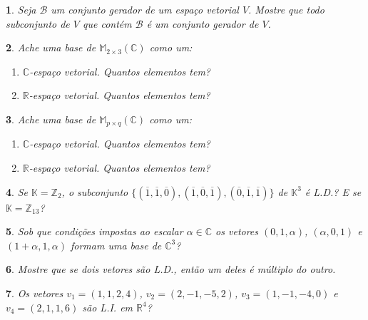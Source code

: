 \documentclass[12pt]{exam}
\newtheorem{exercicio}{}
\newcommand{\integer}{\mathbb{Z}}
\newcommand{\real}{\mathbb{R}}
\newcommand{\complex}{\mathbb{C}}
\newcommand{\cp}[1]{\mathbb{#1}}
\begin{document}
\begin{exercicio}
Seja $\mathcal{B}$ um conjunto gerador de um espa\c{c}o vetorial $V$. Mostre que todo subconjunto de $V$ que cont\'em $\mathcal{B}$ \'e um conjunto gerador de $V$.
\end{exercicio}

\begin{exercicio}
  Ache uma base de $\cp{M}_{2 \times 3}(\complex)$ como um:
  \begin{enumerate}[label={\alph*})]
     \item $\complex$-espa\c{c}o vetorial. Quantos elementos tem?
     \item $\real$-espa\c{c}o vetorial. Quantos elementos tem?
   \end{enumerate}
\end{exercicio}

\begin{exercicio}
  Ache uma base de $\cp{M}_{p \times q}(\complex)$ como um:
  \begin{enumerate}[label={\alph*})]
     \item $\complex$-espa\c{c}o vetorial. Quantos elementos tem?
     \item $\real$-espa\c{c}o vetorial. Quantos elementos tem?
   \end{enumerate}
\end{exercicio}

\begin{exercicio}
  Se $\cp{K} = \integer_2$, o subconjunto $\{(\overline{1}, \overline{1}, \overline{0}), (\overline{1}, \overline{0}, \overline{1}), (\overline{0}, \overline{1}, \overline{1})\}$ de $\cp{K}^3$ \'e L.D.? E se $\cp{K} = \integer_{13}$?
\end{exercicio}

\begin{exercicio}
  Sob que condi\c{c}\~oes impostas ao escalar $\alpha \in \complex$ os vetores $(0,1,\alpha)$, $(\alpha,0,1)$ e $(1 + \alpha, 1, \alpha)$ formam uma base de $\complex^3$?
\end{exercicio}

\begin{exercicio}
  Mostre que se dois vetores s\~ao L.D., ent\~ao um deles \'e m\'ultiplo do outro.
\end{exercicio}

\begin{exercicio}
  Os vetores $v_1 = (1,1,2,4)$, $v_2 = (2,-1,-5,2)$, $v_3 = (1,-1,-4,0)$ e $v_4 = (2,1,1,6)$ s\~ao L.I. em $\real^4$?
\end{exercicio}
\end{document}
